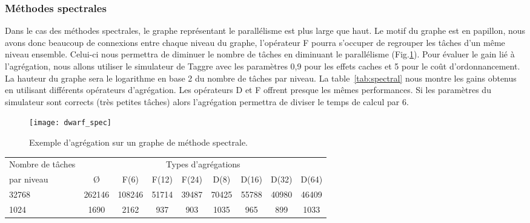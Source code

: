 \subsubsection{Méthodes spectrales}
Dans le cas des méthodes spectrales, le graphe représentant le parallélisme est plus large que haut.
%
Le motif du graphe est en papillon, nous avons donc beaucoup de connexions entre chaque niveau du graphe, l'opérateur F pourra s'occuper de regrouper les tâches d'un même niveau ensemble.
%
Celui-ci nous permettra de diminuer le nombre de tâches en diminuant le parallélisme (Fig.\ref{fig:dwarf_spec}).
%
Pour évaluer le gain lié à l'agrégation, nous allons utiliser le simulateur de Taggre avec les paramètres 0,9 pour les effets caches et 5 pour le coût d'ordonnancement.
%
La hauteur du graphe sera le logarithme en base 2 du nombre de tâches par niveau.
%
La table~\ref{tab:spectral} nous montre les gains obtenus en utilisant différents opérateurs d'agrégation.
%
Les opérateurs D et F offrent presque les mêmes performances.
%
Si les paramètres du simulateur sont corrects (très petites tâches) alors l'agrégation permettra de diviser le temps de calcul par 6.


\begin{figure}
  \centering
  \texttt{[image: dwarf\_spec]}
  \caption{Exemple d'agrégation sur un graphe de méthode spectrale.}
  \label{fig:dwarf_spec}
\end{figure}
\begin{center}
  \begin{tabular}{|l|c|c|c|c|c|c|c|c|}
    \hline
   Nombre de tâches &  \multicolumn{8}{c|}{Types d'agrégations}\\
   par niveau & \O & F(6) & F(12) & F(24) & D(8) & D(16) & D(32) & D(64) \\
    \hline
   32768 & 262146 & 108246 & 51714 & 39487 & 70425 & 55788 & 40980 & 46409 \\
   1024  & 1690   & 2162   & 937   & 903   & 1035  & 965   & 899   & 1033 \\
    \hline
  \end{tabular}
  \label{tab:spectral}
\end{center}

